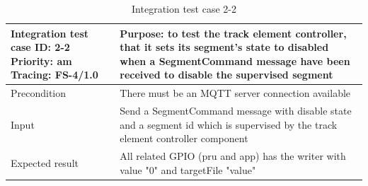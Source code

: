 \begin{table}[H]
	\caption{Integration test case 2-2}
	\label{table:TCase-FSI2-2}
	\begin{center}
		\renewcommand{\arraystretch}{1.8}
		\begin{tabu} 
			to 0.9 \textwidth
			{  X[0.4, c] X[c] }
			\toprule
			Integration test case ID: 2-2 \newline Priority: am \newline Tracing: FS-4/1.0 & Purpose: to test the track element controller, that it sets its segment's state to disabled when a SegmentCommand message have been received to disable the supervised segment \\ \midrule
			Precondition                                                                   & There must be an MQTT server connection available                                                                                                                                 \\
			Input                                                                          & Send a SegmentCommand message with disable state and a segment id which is supervised by the track element controller component                                                   \\
			Expected result                                                                & All related GPIO (pru and app) has the writer with value "0" and targetFile "value"                                                                                               \\ \bottomrule
		\end{tabu}
	\end{center}
\end{table} 

